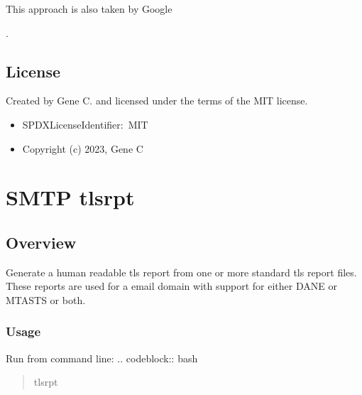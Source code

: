 \documentclass[letterpaper,10pt,english]{sphinxmanual}
\begin{document}
\sphinxAtStartPar
This approach is also taken by Google %
\begin{footnote}[1]\sphinxAtStartFootnote
{}
%
\end{footnote} %
\begin{footnote}[2]\sphinxAtStartFootnote
{}
%
\end{footnote}.


\section{License}
\label{\detokenize{README:license}}
\sphinxAtStartPar
Created by Gene C. and licensed under the terms of the MIT license.
\begin{itemize}
\item {} 
\sphinxAtStartPar
SPDX\sphinxhyphen{}License\sphinxhyphen{}Identifier: MIT

\item {} 
\sphinxAtStartPar
Copyright (c) 2023, Gene C

\end{itemize}

\sphinxstepscope


\chapter{SMTP tls\sphinxhyphen{}rpt}
\label{\detokenize{Readme-TLS:smtp-tls-rpt}}\label{\detokenize{Readme-TLS::doc}}

\section{Overview}
\label{\detokenize{Readme-TLS:overview}}
\sphinxAtStartPar
Generate a human readable tls report from one or more standard tls report files.
These reports are used for a email domain with support for either DANE or MTA\sphinxhyphen{}STS or both.


\subsection{Usage}
\label{\detokenize{Readme-TLS:usage}}
\sphinxAtStartPar
Run from command line:
.. code\sphinxhyphen{}block:: bash
\begin{quote}

\sphinxAtStartPar
tls\sphinxhyphen{}rpt
\end{quote}
\end{document}
